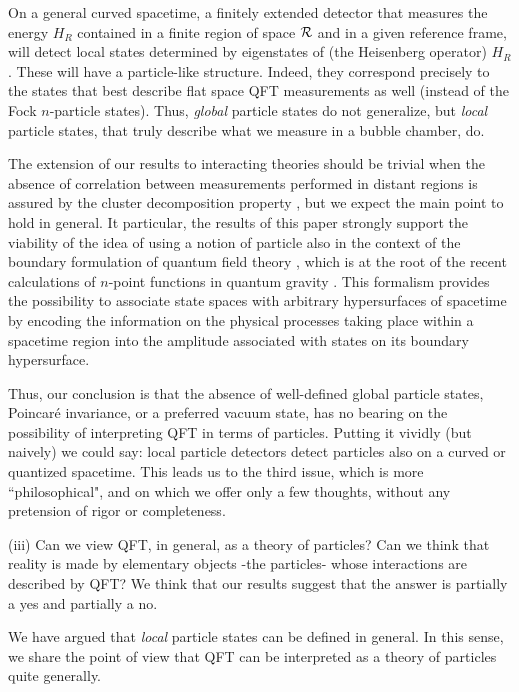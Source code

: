\documentclass[11pt, nofootinbib]{revtex4-2}
\begin{document}
On a general curved spacetime, a finitely extended detector that
measures the energy $H_{R}$ contained in a finite region of space
$\cal R$ and in a given reference frame, will detect local states
determined by eigenstates of (the Heisenberg operator) $H_{R}$.  These
will have a particle-like structure.  Indeed, they correspond
precisely to the states that best describe flat space QFT measurements
as well (instead of the Fock $n$-particle states).  Thus,
\emph{global} particle states do not generalize, but \emph{local}
particle states, that truly describe what we measure in a bubble
chamber, do.  

The extension of our results to interacting theories should 
be trivial  when the absence of correlation between 
measurements performed in distant regions is assured by the 
cluster decomposition property \cite{weinberg}, but we expect 
the main point to hold in general. It particular, the results
of this paper strongly support the viability of the idea of using
a notion of particle also in the context of the boundary formulation
of quantum field theory \cite{boundary,book}, which is at the
root of the recent calculations of $n$-point functions in quantum gravity
\cite{transitions}.  This formalism provides the possibility to associate state spaces 
with arbitrary hypersurfaces of spacetime by encoding the information 
on the physical processes taking place within a spacetime region into 
the amplitude associated with states on its boundary hypersurface. 

Thus, our conclusion is that the absence of well-defined global
particle states, Poincar\'e invariance, or a preferred vacuum state,
has no bearing on the possibility of interpreting QFT in terms of
particles.  Putting it vividly (but naively) we could say: local
particle detectors detect particles also on a curved or quantized
spacetime.  This leads us to the third issue, which is more
``philosophical", and on which we offer only a few thoughts, without 
any pretension of rigor or completeness. 

(iii) Can we view QFT, in general, as a theory of particles?  Can we
think that reality is made by elementary objects -the particles- whose
interactions are described by QFT? We think that our results suggest
that the answer is partially a yes and partially a no.  

We have argued that \emph{local} particle states can be defined in
general.  In this sense, we share the point of view that QFT can be
interpreted as a theory of particles quite generally.
\end{document}
